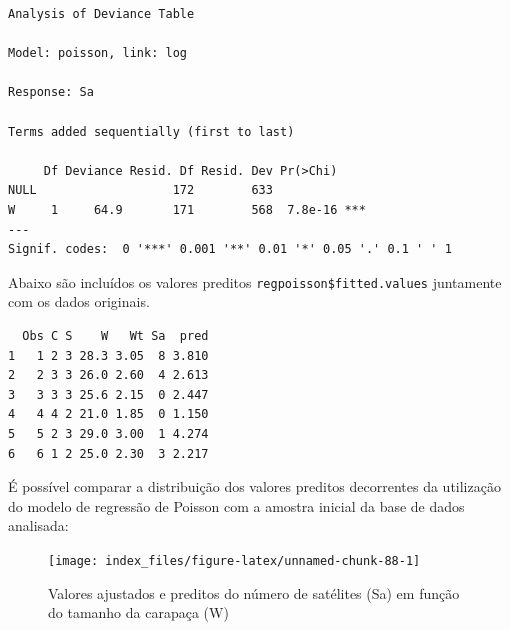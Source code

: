 \documentclass[12pt,brazil,oneside]{book}
\newenvironment{Shaded}{\begin{snugshade}}{\end{snugshade}}
\newcommand{\DataTypeTok}[1]{\textcolor[rgb]{0.13,0.29,0.53}{#1}}
\newcommand{\KeywordTok}[1]{\textcolor[rgb]{0.13,0.29,0.53}{\textbf{#1}}}
\newcommand{\NormalTok}[1]{#1}
\newcommand{\OperatorTok}[1]{\textcolor[rgb]{0.81,0.36,0.00}{\textbf{#1}}}
\newcommand{\StringTok}[1]{\textcolor[rgb]{0.31,0.60,0.02}{#1}}
\begin{document}
\begin{verbatim}
Analysis of Deviance Table

Model: poisson, link: log

Response: Sa

Terms added sequentially (first to last)

     Df Deviance Resid. Df Resid. Dev Pr(>Chi)    
NULL                   172        633             
W     1     64.9       171        568  7.8e-16 ***
---
Signif. codes:  0 '***' 0.001 '**' 0.01 '*' 0.05 '.' 0.1 ' ' 1
\end{verbatim}

Abaixo são incluídos os valores preditos
\texttt{regpoisson\$fitted.values} juntamente com os dados originais.

\begin{Shaded}
\end{Shaded}

\begin{verbatim}
  Obs C S    W   Wt Sa  pred
1   1 2 3 28.3 3.05  8 3.810
2   2 3 3 26.0 2.60  4 2.613
3   3 3 3 25.6 2.15  0 2.447
4   4 4 2 21.0 1.85  0 1.150
5   5 2 3 29.0 3.00  1 4.274
6   6 1 2 25.0 2.30  3 2.217
\end{verbatim}

É possível comparar a distribuição dos valores preditos decorrentes da
utilização do modelo de regressão de Poisson com a amostra inicial da
base de dados analisada:

\begin{Shaded}
\end{Shaded}

\begin{figure}[H]

{\centering \texttt{[image: index\_files/figure-latex/unnamed-chunk-88-1]} 

}

\caption{Valores ajustados e preditos do número de satélites (Sa) em função do tamanho da carapaça (W)}\label{fig:unnamed-chunk-88}
\end{figure}
\end{document}
